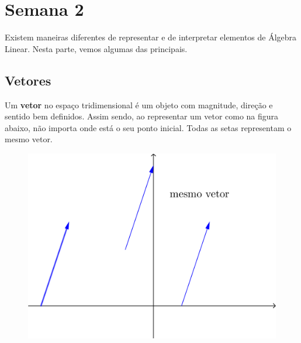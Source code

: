 

\providecommand{\dir}{..}


%

\chapter{Semana 2}

\vspace{0.5cm}

Existem maneiras diferentes de representar e de interpretar elementos de Álgebra Linear. Nesta parte, vemos algumas das principais.


\section{Vetores}

Um \textbf{vetor} no espaço tridimensional é um objeto com magnitude, direção e sentido bem definidos. Assim sendo, ao representar um vetor como na figura abaixo, não importa onde está o seu ponto inicial. Todas as setas representam o mesmo vetor.

\begin{figure}[h!]
\begin{center}
\includegraphics[width=0.3\linewidth]{Semana02/semana02-vetor}
\end{center}
\end{figure}

